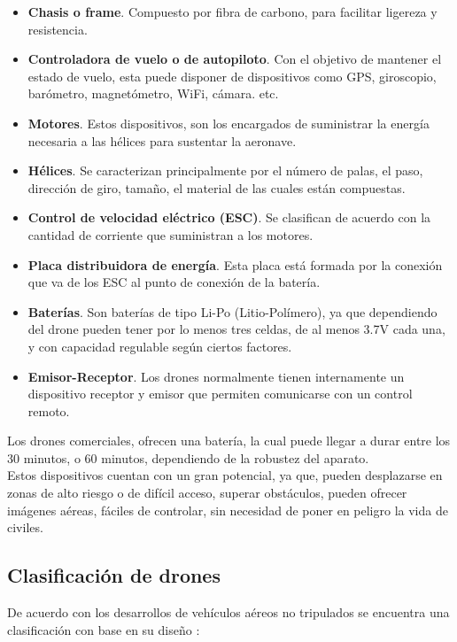\begin{itemize}
	\item \textbf{Chasis o frame}. 
		Compuesto por fibra de carbono, para facilitar ligereza y 
		resistencia.
	\item \textbf{Controladora de vuelo o de autopiloto}. 
		Con el objetivo de mantener el estado de vuelo, esta puede 
		disponer de dispositivos como GPS, giroscopio, barómetro, 
		magnetómetro, WiFi, cámara. etc.
	\item \textbf{Motores}. 
		Estos dispositivos, son los encargados de suministrar la energía 
		necesaria a las hélices para sustentar la aeronave.
	\item \textbf{Hélices}. 
		 Se caracterizan principalmente por el número de palas, el paso, 
		dirección de giro, tamaño, el material de las cuales están 
		compuestas.
	\item \textbf{Control de velocidad eléctrico (ESC)}. 
		Se clasifican de acuerdo con la cantidad de corriente que 
		suministran a los motores.
	\item \textbf{Placa distribuidora de energía}. 
		Esta placa está formada por la conexión que va de los ESC al 
		punto de conexión de la batería.
	\item \textbf{Baterías}. 
		Son baterías de tipo Li-Po (Litio-Polímero), ya que dependiendo 
		del drone pueden tener por lo menos tres celdas, de al menos 
		3.7V cada una, y con capacidad regulable según ciertos factores.
	\item \textbf{Emisor-Receptor}. 
		 Los drones normalmente tienen internamente un dispositivo 
		receptor y emisor que permiten comunicarse con un control 
		remoto.
\end{itemize}

Los drones comerciales, ofrecen una batería, la cual puede llegar a durar entre 
los 30 minutos, o 60 minutos, dependiendo de la robustez del aparato. \\

Estos dispositivos cuentan con un gran potencial, ya que, pueden desplazarse en 
zonas de alto riesgo o de difícil acceso, superar obstáculos, pueden ofrecer 
imágenes aéreas, fáciles de controlar, sin necesidad de poner en peligro la vida 
de civiles.  

%
\subsection{Clasificación de drones}
De acuerdo con los desarrollos de vehículos aéreos no tripulados se encuentra 
una clasificación con base en su diseño 
\cite{app_veh_no_tripulados_hidr, x_drone_clasificacion}:

